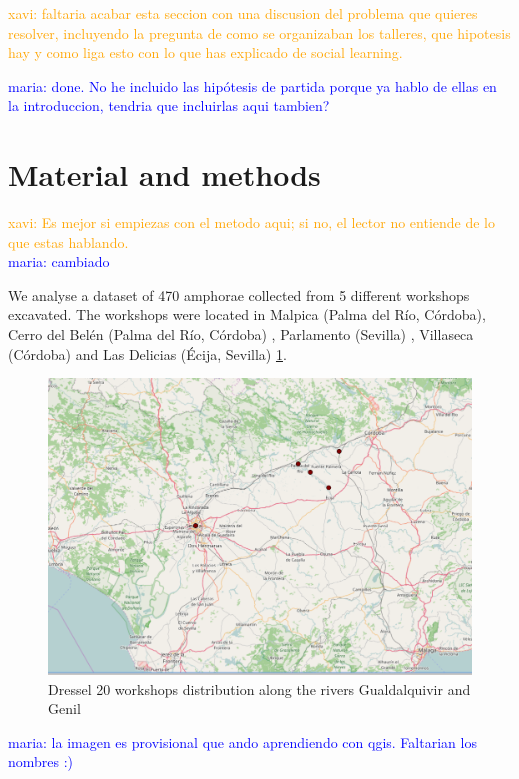 \documentclass[review]{elsarticle}
\newcommand{\memo}[2]{\textcolor{#1}{#2}}
\newcommand{\xavi}[1]{\memo{orange}{xavi: #1\\}}
\newcommand{\maria}[1]{\memo{blue}{maria: #1\\}}
\begin{document}
\xavi{faltaria acabar esta seccion con una discusion del problema que quieres resolver, incluyendo la pregunta de como se organizaban los talleres, que hipotesis hay y como liga esto con lo que has explicado de social learning.}

\maria{done. No he incluido las hipótesis de partida porque ya hablo de ellas en la introduccion, tendria que incluirlas aqui tambien?}

\section{Material and methods}

\xavi{Es mejor si empiezas con el metodo aqui; si no, el lector no entiende de lo que estas hablando.}
\maria{cambiado}

We analyse a dataset of 470 amphorae collected from 5 different workshops excavated. The workshops were located in Malpica (Palma del R\'io, C\'ordoba), Cerro del Bel\'en (Palma del R\'io, C\'ordoba) \citep{diaz_trujillo_excavacion_1992}, Parlamento (Sevilla) \citep{garcia_vargas_anforas_2000}, Villaseca (C\'ordoba)\citep{garcia_vargas_enrique_excavacion_????} and Las Delicias (\'Ecija, Sevilla) \citep{fernandez_excavacion_2001,_atelier_2014} \ref{romanworkshop}. 


\begin{figure}[htp]
	\centering
\includegraphics[scale=0.30]{romanworkshop.png}
\caption{Dressel 20 workshops distribution along the rivers Gualdalquivir and Genil}
\label{romanworkshop}
\end{figure} 

\maria{la imagen es provisional que ando aprendiendo con qgis. Faltarian los nombres :)}
\end{document}
